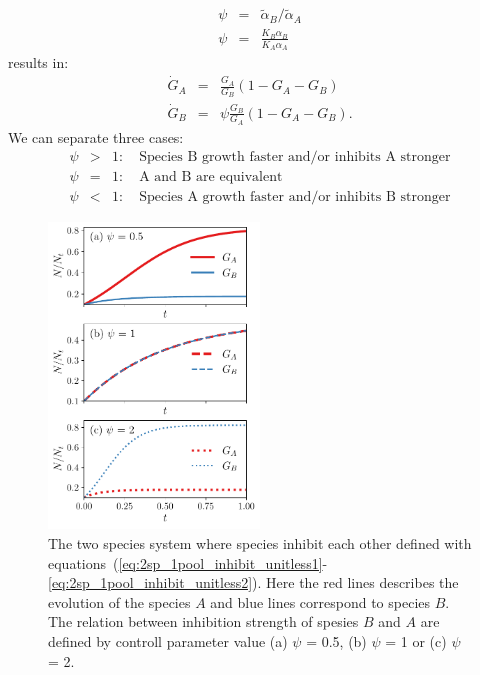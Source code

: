 \documentclass[10pt,A4paper]{article}
\begin{document}
\begin{eqnarray}
    \psi&=&\tilde{\alpha}_B/\tilde{\alpha}_A\\
    \psi&=&\frac{K_B\alpha_B}{K_A\alpha_A}
\end{eqnarray}
results in: 
\begin{eqnarray}
    \dot{G}_A &=&\frac{G_A}{G_B}\left(1 - G_A-G_B\right)
    \label{eq:2sp_1pool_inhibit_unitless1}\\
    \dot{G}_B &=&\psi\frac{G_B}{G_A}\left(1-G_A-G_B\right). 
    \label{eq:2sp_1pool_inhibit_unitless2}
\end{eqnarray}
We can separate three cases: 
\begin{eqnarray}
    \psi&>&1:\quad\text{Species B growth faster and/or inhibits A stronger}\\
    \psi&=&1:\quad\text{A and B are equivalent}\\
    \psi&<&1:\quad\text{Species A growth faster and/or inhibits B stronger}
\end{eqnarray}
%
\begin{figure}[H]
    \begin{center}
    \includegraphics[width=0.5\textwidth]{Figures/pool_model_1pool_inhib.pdf}
    \caption{{\footnotesize The two species system where species inhibit each other defined with equations~(\ref{eq:2sp_1pool_inhibit_unitless1}-\ref{eq:2sp_1pool_inhibit_unitless2}).
    Here the red lines describes the evolution of the species $A$ and blue lines correspond to species $B$.
    The relation between inhibition strength of spesies $B$ and $A$ are defined by controll parameter value (a) $\psi$ = 0.5, (b) $\psi$ = 1 or (c) $\psi$ = 2.}}
    \label{fig:1pool_2sp_inhibit}
    \end{center}
\end{figure}
%
%
\end{document}
